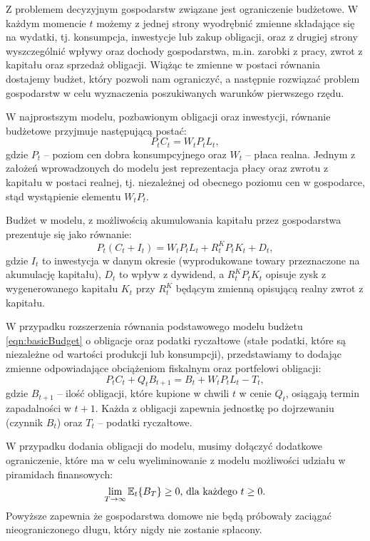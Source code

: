 Z problemem decyzyjnym gospodarstw związane jest ograniczenie budżetowe. W każdym momencie $t$ możemy z jednej strony wyodrębnić zmienne składające się na wydatki, tj. konsumpcja, inwestycje lub zakup obligacji, oraz z drugiej strony  wyszczególnić wpływy oraz dochody gospodarstwa, m.in. zarobki z pracy, zwrot z kapitału oraz sprzedaż obligacji. Wiążąc te zmienne w postaci równania dostajemy budżet, który pozwoli nam ograniczyć, a następnie rozwiązać problem gospodarstw w celu wyznaczenia poszukiwanych warunków pierwszego rzędu.

W najprostszym modelu, pozbawionym obligacji oraz inwestycji, równanie budżetowe przyjmuje następującą postać:
\begin{equation}
    \label{eqn:basicBudget}
    P_t C_t = W_t P_t L_t,
\end{equation}
gdzie $P_t$ -- poziom cen dobra konsumpcyjnego oraz $W_t$ -- płaca realna. Jednym z założeń wprowadzonych do modelu jest reprezentacja płacy oraz zwrotu z kapitału w postaci realnej, tj. niezależnej od obecnego poziomu cen w gospodarce, stąd wystąpienie elementu $W_t P_t$. 

Budżet w modelu, z możliwością akumulowania kapitału przez gospodarstwa prezentuje się jako równanie:
\begin{equation}
    \label{eq:budget_dividend}
    P_t (C_t + I_t) = W_t P_t L_t + R^K_t P_t K_t + D_t,
\end{equation}
gdzie $I_t$ to inwestycja w danym okresie (wyprodukowane towary przeznaczone na akumulację kapitału), $D_t$ to wpływ z dywidend, a $R^K_t P_t K_t$ opisuje zysk z wygenerowanego kapitału $K_t$ przy $R^K_t$ będącym zmienną opisującą realny zwrot z kapitału.

W przypadku rozszerzenia równania podstawowego modelu budżetu \eqref{eqn:basicBudget} o obligacje oraz podatki ryczałtowe (stałe podatki, które są niezależne od wartości produkcji lub konsumpcji), przedstawiamy to dodając zmienne odpowiadające obciążeniom fiskalnym oraz portfelowi obligacji:
\begin{equation}
    P_t C_t + Q_t B_{t+1} = B_{t} + W_t P_t L_t - T_t,
\end{equation}
gdzie $B_{t+1}$ -- ilość obligacji, które kupione w chwili $t$ w cenie $Q_t$, osiągają termin zapadalności w $t+1$. Każda z obligacji zapewnia jednostkę po dojrzewaniu (czynnik $B_{t}$) oraz $T_t$ -- podatki ryczałtowe.

W przypadku dodania obligacji do modelu, musimy dołączyć dodatkowe ograniczenie, które ma w celu wyeliminowanie z modelu możliwości udziału w piramidach finansowych:
\begin{equation}
    \lim_{T\to\infty} \mathbb{E}_t\{B_T\} \geq 0 \text{, dla każdego } t \ge 0.
\end{equation}
Powyższe zapewnia że gospodarstwa domowe nie będą próbowały zaciągać nieograniczonego długu, który nigdy nie zostanie spłacony.

